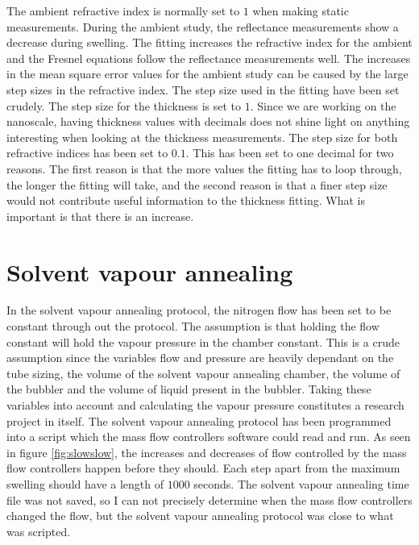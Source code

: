 \documentclass[MasterThesisMain.tex]{subfiles}
\begin{document}
The ambient refractive index is normally set to $1$ when making static measurements. During the ambient study, the reflectance measurements show a decrease during swelling. The fitting increases the refractive index for the ambient and the Fresnel equations follow the reflectance measurements well. The increases in the mean square error values for the ambient study can be caused by the large step sizes in the refractive index. The step size used in the  fitting have been set crudely. The step size for the thickness is set to $1$. Since we are working on the nanoscale, having thickness values with decimals does not shine light on anything interesting when looking at the thickness measurements. The step size for both refractive indices has been set to $0.1$. This has been set to one decimal for two reasons. The first reason is that the more values the fitting has to loop through, the longer the fitting will take, and the second reason is that a finer step size would not contribute useful information to the thickness fitting. What is important is that there is an increase.        

\section{Solvent vapour annealing}
In the solvent vapour annealing protocol, the nitrogen flow has been set to be constant through out the protocol. The assumption is that holding the flow constant will hold the vapour pressure in the chamber constant. This is a crude assumption since the variables flow and pressure are heavily dependant on the tube sizing, the volume of the solvent vapour annealing chamber, the volume of the bubbler and the volume of liquid present in the bubbler. Taking these variables into account and calculating the vapour pressure constitutes a research project in itself. The solvent vapour annealing protocol has been programmed into a script which the mass flow controllers software could read and run. As seen in figure \ref{fig:slowslow}, the increases and decreases of flow controlled by the mass flow controllers happen before they should. Each step apart from the maximum swelling should have a length of $1000$ seconds. The solvent vapour annealing time file was not saved, so I can not precisely determine when the mass flow controllers changed the flow, but the solvent vapour annealing protocol was close to what was scripted.   
\end{document}
